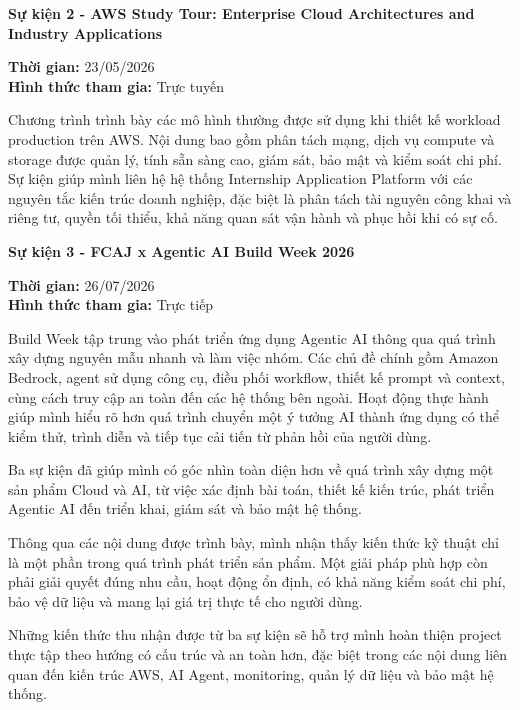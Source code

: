 \vspace{0.5em}\noindent\textbf{Sự kiện 2 - AWS Study Tour: Enterprise Cloud
Architectures and Industry
Applications}\par

\textbf{Thời gian:} 23/05/2026\\
\textbf{Hình thức tham gia:} Trực tuyến

Chương trình trình bày các mô hình thường được sử dụng khi thiết kế
workload production trên AWS. Nội dung bao gồm phân tách mạng, dịch vụ
compute và storage được quản lý, tính sẵn sàng cao, giám sát, bảo mật và
kiểm soát chi phí. Sự kiện giúp mình liên hệ hệ thống Internship
Application Platform với các nguyên tắc kiến trúc doanh nghiệp, đặc biệt
là phân tách tài nguyên công khai và riêng tư, quyền tối thiểu, khả năng
quan sát vận hành và phục hồi khi có sự cố.

\vspace{0.5em}\noindent\textbf{Sự kiện 3 - FCAJ x Agentic AI Build Week
2026}\par

\textbf{Thời gian:} 26/07/2026\\
\textbf{Hình thức tham gia:} Trực tiếp

Build Week tập trung vào phát triển ứng dụng Agentic AI thông qua quá
trình xây dựng nguyên mẫu nhanh và làm việc nhóm. Các chủ đề chính gồm
Amazon Bedrock, agent sử dụng công cụ, điều phối workflow, thiết kế
prompt và context, cùng cách truy cập an toàn đến các hệ thống bên
ngoài. Hoạt động thực hành giúp mình hiểu rõ hơn quá trình chuyển một ý
tưởng AI thành ứng dụng có thể kiểm thử, trình diễn và tiếp tục cải tiến
từ phản hồi của người dùng.

Ba sự kiện đã giúp mình có góc nhìn toàn diện hơn về quá trình xây dựng
một sản phẩm Cloud và AI, từ việc xác định bài toán, thiết kế kiến trúc,
phát triển Agentic AI đến triển khai, giám sát và bảo mật hệ thống.

Thông qua các nội dung được trình bày, mình nhận thấy kiến thức kỹ thuật
chỉ là một phần trong quá trình phát triển sản phẩm. Một giải pháp phù
hợp còn phải giải quyết đúng nhu cầu, hoạt động ổn định, có khả năng
kiểm soát chi phí, bảo vệ dữ liệu và mang lại giá trị thực tế cho người
dùng.

Những kiến thức thu nhận được từ ba sự kiện sẽ hỗ trợ mình hoàn thiện
project thực tập theo hướng có cấu trúc và an toàn hơn, đặc biệt trong
các nội dung liên quan đến kiến trúc AWS, AI Agent, monitoring, quản lý
dữ liệu và bảo mật hệ thống.
